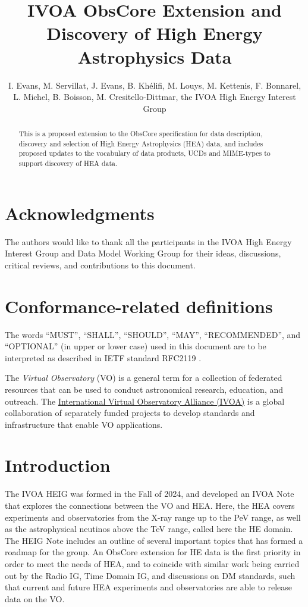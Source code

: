 \documentclass[11pt,a4paper]{ivoa}
\title{IVOA ObsCore Extension and Discovery of High Energy Astrophysics Data}
\author{I. Evans, M. Servillat, J. Evans, B. Khélifi, M. Louys, M. Kettenis, F. Bonnarel, L. Michel, B. Boisson, M. Cresitello-Dittmar, the IVOA High Energy Interest Group}
\begin{document}
\begin{abstract}
This is a proposed extension to the ObsCore specification for data description, discovery and selection of High Energy Astrophysics (HEA) data, and includes proposed updates to the vocabulary of data products, UCDs and MIME-types to support discovery of HEA data.  
\end{abstract}


\section*{Acknowledgments}

The authors would like to thank all the participants in the IVOA High Energy Interest Group and Data Model Working Group for their ideas, discussions, critical reviews, and contributions to this document.


\section*{Conformance-related definitions}

The words ``MUST'', ``SHALL'', ``SHOULD'', ``MAY'', ``RECOMMENDED'', and ``OPTIONAL'' (in upper or lower case) used in this document are to be interpreted as described in IETF standard RFC2119 \citep{std:RFC2119}.

The \emph{Virtual Observatory} (VO) is a general term for a collection of federated resources that can be used to conduct astronomical research, education, and outreach.
The \href{https://www.ivoa.net}{International Virtual Observatory Alliance (IVOA)} is a global collaboration of separately funded projects to develop standards and infrastructure that enable VO applications.


\section{Introduction}

The \gls{IVOA} \gls{HEIG} was formed in the Fall of 2024, and developed an \gls{IVOA} Note \citep{2024ivoa.note.heig} that explores the connections between the \gls{VO} and \gls{HEA}. Here, the \gls{HEA} covers experiments and observatories from the X-ray range up to the PeV range, as well as the astrophysical neutinos above the TeV range, called here the \gls{HE} domain. The HEIG Note includes an outline of several important topics that has formed a roadmap for the group. An ObsCore \citep{2017ivoa.spec.0509L} extension for \gls{HE} data is the first priority in order to meet the needs of HEA, and to coincide with similar work being carried out by the Radio IG, Time Domain IG, and discussions on DM standards, such that current and future \gls{HEA} experiments and observatories are able to release data on the \gls{VO}.
\end{document}
